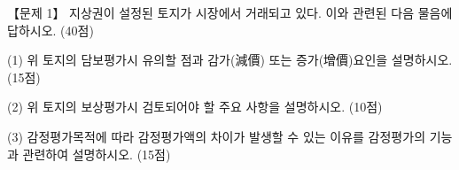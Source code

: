 \begin{longquestion}{【문제 1】}
지상권이 설정된 토지가 시장에서 거래되고 있다. 이와 관련된 다음 물음에 답하시오. (40점) \par
\medskip\noindent (1) 위 토지의 담보평가시 유의할 점과 감가(減價) 또는 증가(增價)요인을 설명하시오. (15점) \par
\medskip\noindent (2) 위 토지의 보상평가시 검토되어야 할 주요 사항을 설명하시오. (10점) \par
\medskip\noindent (3) 감정평가목적에 따라 감정평가액의 차이가 발생할 수 있는 이유를 감정평가의 기능과 관련하여 설명하시오. (15점) \par
\end{longquestion}
